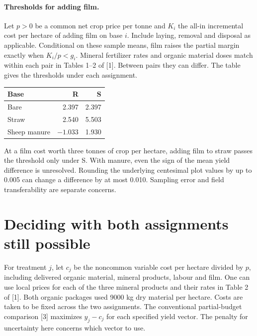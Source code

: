 \documentclass[11pt]{article}
\begin{document}
\paragraph{Thresholds for adding film.} Let $p>0$ be a common net crop price per tonne and $K_i$ the all-in incremental cost per hectare of adding film on base $i$. Include laying, removal and disposal as applicable. Conditional on these sample means, film raises the partial margin exactly when $K_i/p<g_i$. Mineral fertilizer rates and organic material doses match within each pair in Tables 1--2 of [1]. Between pairs they can differ. The table gives the thresholds under each assignment.
\begin{center}
\begin{tabular}{lrr}\toprule Base & R & S\\ \midrule
Bare &2.397&2.397\\ Straw &2.540&5.503\\ Sheep manure &$-1.033$&1.930\\ \bottomrule
\end{tabular}
\end{center}
At a film cost worth three tonnes of crop per hectare, adding film to straw passes the threshold only under S. With manure, even the sign of the mean yield difference is unresolved. Rounding the underlying centesimal plot values by up to 0.005 can change a difference by at most 0.010. Sampling error and field transferability are separate concerns.

\newpage
\section{Deciding with both assignments still possible}
For treatment $j$, let $c_j$ be the noncommon variable cost per hectare divided by $p$, including delivered organic material, mineral products, labour and film. One can use local prices for each of the three mineral products and their rates in Table 2 of [1]. Both organic packages used 9000 kg dry material per hectare. Costs are taken to be fixed across the two assignments. The conventional partial-budget comparison [3] maximizes $y_j-c_j$ for each specified yield vector. The penalty for uncertainty here concerns which vector to use.
\end{document}
